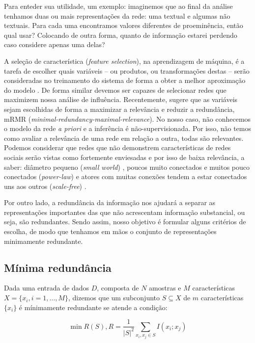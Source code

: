 Para enteder sua utilidade, um exemplo: imaginemos que ao final da análise
tenhamos duas ou mais representações da rede: uma textual e algumas não textuais.
Para cada uma encontramos valores diferentes de proeminência, então qual usar?
Colocando de outra forma, quanto de informação estarei perdendo caso considere
apenas uma delas?

A seleção de característica (\emph{feature selection}), na aprendizagem de
máquina, é a tarefa de escolher quais variáveis -- ou produtos, ou transformações
destas -- serão consideradas no treinamento do sistema de forma a obter a melhor
aproximação do modelo \citep{Jain1997, Blum1997, Jain2000}. De forma similar
devemos ser capazes de selecionar redes que maximizem nossa análise de
influência. Recentemente, \citet{Peng2005} sugere que as variáveis sejam
escolhidas de forma a maximizar a relevância e reduzir a redundância, mRMR
(\emph{minimal-redundancy-maximal-relevance}). No nosso caso, não conhecemos o
modelo da rede \emph{a priori} e a inferência é não-supervisionada. Por isso, não
temos como avaliar a relevância de uma rede em relação a outra, todas são
relevantes. Podemos considerar que redes que não demonstrem características de
redes sociais serão vistas como fortemente enviesadas e por isso de baixa
relevância, a saber: diâmetro pequeno (\emph{small world}) \citep{Milgram1967,
Watts1998}, poucos muito conectados e muitos pouco conectados (\emph{power-law})
\citep{Liljeros2001, Mitzenmacher2004} e atores com muitas conexões tendem a
estar conectados uns aos outros (\emph{scale-free}) \citep{Li2005}.

Por outro lado, a redundância da informação nos ajudará a separar as
representações importantes das que não acrescentam informação substancial, ou
seja, são redundantes. Sendo assim, nosso objetivo é formular alguns critérios
de escolha, de modo que tenhamos em mãos o conjunto de representações
minimamente redundante.

\subsection{Mínima redundância}

Dada uma entrada de dados $D$, composta de $N$ amostras e $M$
características $X=\{x_i, i=1,\ldots,M\}$, dizemos que um subconjunto $S
\subseteq X$ de $m$ características $\{x_i\}$ é mínimamente redundante se atende
a condição:

\begin{equation}
\label{def:min_redun}
\min R(S), R = \frac{1}{|S|^2}\sum_{x_i, x_j \in S}I(x_i;x_j)
\end{equation}

